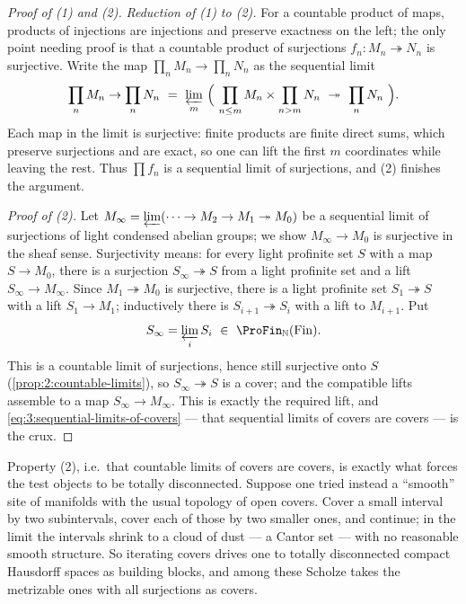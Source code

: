 \begin{proof}[Proof of \textup{(1)} and \textup{(2)}]
\emph{Reduction of \textup{(1)} to \textup{(2)}.} For a countable product of
maps, products of injections are injections and preserve exactness on the left;
the only point needing proof is that a countable product of surjections
$f_n\colon M_n\twoheadrightarrow N_n$ is surjective. Write the map
$\prod_n M_n\to\prod_n N_n$ as the sequential limit
\begin{equation*}
\prod_n M_n\to\prod_n N_n\ =\
\varprojlim_m\ \Bigl(\ \prod_{n\leq m} M_n\times\prod_{n>m} N_n\
\twoheadrightarrow\ \prod_n N_n\ \Bigr).
\end{equation*}
Each map in the limit is surjective: finite products are finite direct sums,
which preserve surjections and are exact, so one can lift the first $m$
coordinates while leaving the rest. Thus $\prod f_n$ is a sequential limit of
surjections, and \textup{(2)} finishes the argument.

\emph{Proof of \textup{(2)}.} Let $M_\infty=\varprojlim(\cdots\to M_2\to
M_1\twoheadrightarrow M_0)$ be a sequential limit of surjections of light
condensed abelian groups; we show $M_\infty\to M_0$ is surjective in the sheaf
sense. Surjectivity means: for every light profinite set $S$ with a map $S\to
M_0$, there is a surjection $S_\infty\twoheadrightarrow S$ from a light profinite
set and a lift $S_\infty\to M_\infty$. Since $M_1\twoheadrightarrow M_0$ is
surjective, there is a light profinite set $S_1\twoheadrightarrow S$ with a lift
$S_1\to M_1$; inductively there is $S_{i+1}\twoheadrightarrow S_i$ with a lift to
$M_{i+1}$. Put
\begin{equation*}
S_\infty=\varprojlim_i S_i\ \in\ \ProFin_{\mathbb{N}}(\mathrm{Fin}).
\end{equation*}
This is a countable limit of surjections, hence still surjective onto $S$
(\cref{prop:2:countable-limits}), so $S_\infty\twoheadrightarrow S$ is a cover;
and the compatible lifts assemble to a map $S_\infty\to M_\infty$. This is
exactly the required lift, and \eqref{eq:3:sequential-limits-of-covers} --- that
sequential limits of covers are covers --- is the crux.
\end{proof}

\begin{remark}
\label{rmk:3:totally-disconnected-forced}
Property (2), i.e.\ that countable limits of covers are covers, is exactly what
forces the test objects to be totally disconnected. Suppose one tried instead a
``smooth'' site of manifolds with the usual topology of open covers. Cover a
small interval by two subintervals, cover each of those by two smaller ones, and
continue; in the limit the intervals shrink to a cloud of dust --- a Cantor set
--- with no reasonable smooth structure. So iterating covers drives one to
totally disconnected compact Hausdorff spaces as building blocks, and among these
Scholze takes the metrizable ones with all surjections as covers.
\end{remark}

